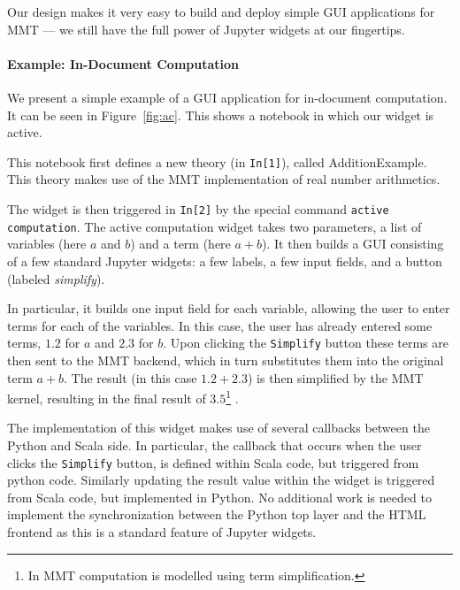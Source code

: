 Our design makes it very easy to build and deploy simple GUI applications for MMT --- we still have the full power of Jupyter widgets at our fingertips.

\paragraph*{Example: In-Document Computation}

We present a simple example of a GUI application for in-document computation.
It can be seen in Figure~\ref{fig:ac}.
This shows a notebook in which our widget is active. 

This notebook first defines a new theory (in \texttt{In[1]}), called AdditionExample.
This theory makes use of the MMT implementation of real number arithmetics.  

The widget is then triggered in \texttt{In[2]} by the special command \texttt{active computation}. 
The active computation widget takes two parameters, a list of variables (here $a$ and $b$) and a term (here $a + b$). 
It then builds a GUI consisting of a few standard Jupyter widgets: a few labels, a few input fields, and a button (labeled \textit{simplify}). 

In particular, it builds one input field for each variable, allowing the user to enter terms for each of the variables. 
In this case, the user has already entered some terms, $1.2$ for $a$ and $2.3$ for $b$. 
Upon clicking the \texttt{Simplify} button these terms are then sent to the MMT backend, which in turn substitutes them into the original term $a + b$. 
The result (in this case $1.2 + 2.3$) is then simplified by the MMT kernel, resulting in the final result of $3.5$\footnote{In MMT computation is modelled using term simplification. } . 

The implementation of this widget makes use of several callbacks between the Python and Scala side. 
In particular, the callback that occurs when the user clicks the \texttt{Simplify} button, is defined within Scala code, but triggered from python code. 
Similarly updating the result value within the widget is triggered from Scala code, but implemented in Python. 
No additional work is needed to implement the synchronization between the Python top layer and the HTML frontend as this is a standard feature of Jupyter widgets.


